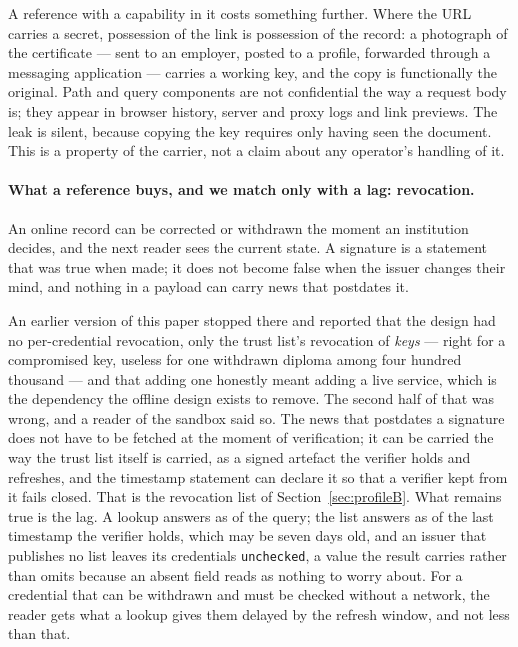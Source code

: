 \documentclass[10pt,a4paper,twocolumn]{article}
\newcommand{\code}[1]{\texttt{\small #1}}
\begin{document}
A reference with a capability in it costs something further. Where the URL
carries a secret, possession of the link is possession of the record: a
photograph of the certificate --- sent to an employer, posted to a profile,
forwarded through a messaging application --- carries a working key, and the copy
is functionally the original. Path and query components are not confidential the
way a request body is; they appear in browser history, server and proxy logs and
link previews. The leak is silent, because copying the key requires only having
seen the document. This is a property of the carrier, not a claim about any
operator's handling of it.

\paragraph{What a reference buys, and we match only with a lag: revocation.}
An online record can be corrected or withdrawn the moment an institution
decides, and the next reader sees the current state. A signature is a
statement that was true when made; it does not become false when the issuer
changes their mind, and nothing in a payload can carry news that postdates it.

An earlier version of this paper stopped there and reported that the design
had no per-credential revocation, only the trust list's revocation of
\emph{keys} --- right for a compromised key, useless for one withdrawn diploma
among four hundred thousand --- and that adding one honestly meant adding a
live service, which is the dependency the offline design exists to remove.
The second half of that was wrong, and a reader of the sandbox said so. The
news that postdates a signature does not have to be fetched at the moment of
verification; it can be carried the way the trust list itself is carried, as
a signed artefact the verifier holds and refreshes, and the timestamp
statement can declare it so that a verifier kept from it fails closed. That is
the revocation list of Section~\ref{sec:profileB}. What remains true is the
lag. A lookup answers as of the query; the list answers as of the last
timestamp the verifier holds, which may be seven days old, and an issuer that
publishes no list leaves its credentials \code{unchecked}, a value the result
carries rather than omits because an absent field reads as nothing to worry
about. For a credential that can be withdrawn and must be checked without a
network, the reader gets what a lookup gives them delayed by the refresh
window, and not less than that.
\end{document}
